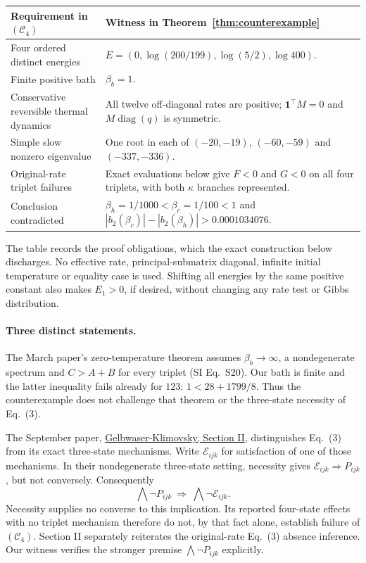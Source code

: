 \documentclass[11pt]{article}
\newcommand{\diag}{\operatorname{diag}}
\begin{document}
\begin{center}\small
\begin{tabular}{p{}p{}}
\toprule Requirement in $(\mathcal C_4)$&Witness in Theorem~\ref{thm:counterexample}\\\midrule
Four ordered distinct energies&$E=(0,\log(200/199),\log(5/2),\log400)$.\\
Finite positive bath&$\beta_b=1$.\\
Conservative reversible thermal dynamics&All twelve off-diagonal rates are positive; $\mathbf1^\top M=0$ and $M\diag(q)$ is symmetric.\\
Simple slow nonzero eigenvalue&One root in each of $(-20,-19)$, $(-60,-59)$ and $(-337,-336)$.\\
Original-rate triplet failures&Exact evaluations below give $F<0$ and $G<0$ on all four triplets, with both $\kappa$ branches represented.\\
Conclusion contradicted&$\beta_h=1/1000<\beta_c=1/100<1$ and $|b_2(\beta_c)|-|b_2(\beta_h)|>0.0001034076$.\\\bottomrule
\end{tabular}
\end{center}
The table records the proof obligations, which the exact construction below discharges. No effective rate, principal-submatrix diagonal, infinite initial temperature or equality case is used. Shifting all energies by the same positive constant also makes $E_1>0$, if desired, without changing any rate test or Gibbs distribution.

\paragraph{Three distinct statements.}
The March paper's zero-temperature theorem assumes $\beta_b\to\infty$, a nondegenerate spectrum and $C>A+B$ for every triplet (SI Eq.~S20). Our bath is finite and the latter inequality fails already for $123$: $1<28+1799/8$. Thus the counterexample does not challenge that theorem or the three-state necessity of Eq.~(3).

The September paper, \href{https://arxiv.org/html/2609.09988v1#S2}{Gelbwaser-Klimovsky, Section II}, distinguishes Eq.~(3) from its exact three-state mechanisms. Write $\mathcal E_{ijk}$ for satisfaction of one of those mechanisms. In their nondegenerate three-state setting, necessity gives $\mathcal E_{ijk}\Rightarrow P_{ijk}$, but not conversely. Consequently
\[
\bigwedge\neg P_{ijk}\ \Longrightarrow\ \bigwedge\neg\mathcal E_{ijk}.
\]
Necessity supplies no converse to this implication. Its reported four-state effects with no triplet mechanism therefore do not, by that fact alone, establish failure of $(\mathcal C_4)$. Section II separately reiterates the original-rate Eq.~(3) absence inference. Our witness verifies the stronger premise $\bigwedge\neg P_{ijk}$ explicitly.
\end{document}
